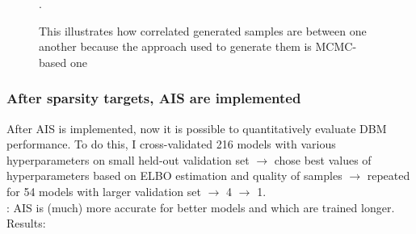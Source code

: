 \begin{figure}[h]
\begin{mdframed}
\caption{This illustrates how correlated generated samples are between one another because the approach used to generate them is MCMC-based one}.
\end{mdframed}
\end{figure}

\clearpage
\subsubsection{After sparsity targets, AIS are implemented}
After AIS is implemented, now it is possible to quantitatively evaluate DBM performance. To do this, I cross-validated 216 models with various hyperparameters on small held-out validation set $\rightarrow$ chose best values of hyperparameters based on ELBO estimation and quality of samples $\rightarrow$ repeated for 54 models with larger validation set $\rightarrow$ 4 $\rightarrow$ 1.
\\
: AIS is (much) more accurate for better models and which are trained longer.
Results:


